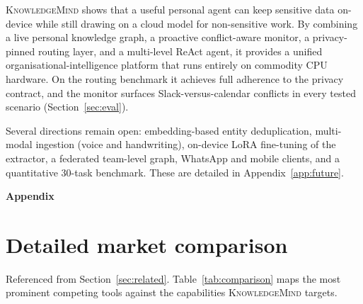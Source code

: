 \documentclass{ecai}
\newcommand{\km}{\textsc{KnowledgeMind}}
\begin{document}
\km{} shows that a useful personal agent can keep sensitive data on-device while
still drawing on a cloud model for non-sensitive work. By combining a live
personal knowledge graph, a proactive conflict-aware monitor, a privacy-pinned
routing layer, and a multi-level ReAct agent, it provides a unified
organisational-intelligence platform that runs entirely on commodity CPU
hardware. On the routing benchmark it achieves full adherence to the privacy
contract, and the monitor surfaces Slack-versus-calendar conflicts in every
tested scenario (Section~\ref{sec:eval}).

Several directions remain open: embedding-based entity deduplication, multi-modal
ingestion (voice and handwriting), on-device LoRA fine-tuning of the extractor, a
federated team-level graph, WhatsApp and mobile clients, and a quantitative
30-task benchmark. These are detailed in Appendix~\ref{app:future}.






\clearpage     %
\appendix

{\par\centering\Large\bfseries Appendix\par}\medskip


\section{Detailed market comparison}\label{app:comparison}

Referenced from Section~\ref{sec:related}. Table~\ref{tab:comparison} maps the
most prominent competing tools against the capabilities \km{} targets.
\end{document}
